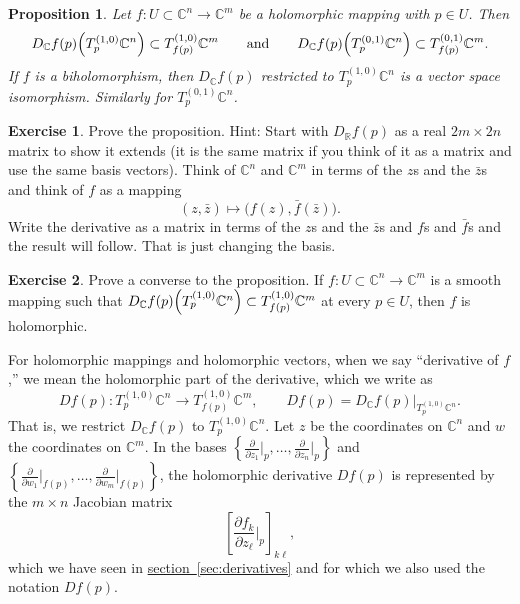 \documentclass[12pt,openany]{book}
\newcommand{\C}{{\mathbb{C}}}
\newcommand{\R}{{\mathbb{R}}}
\theoremstyle{plain}
\newtheorem{prop}[thm]{Proposition}
\theoremstyle{remark}
\theoremstyle{definition}
\newenvironment{exbox}{%
    \def\FrameCommand{\vrule width 1pt \relax\hspace{10pt}}%
    \MakeFramed{\advance\hsize-\width\FrameRestore}%
}{%
    \endMakeFramed
}
\theoremstyle{exercise}
\newtheorem{exercise}{Exercise}[section]
\theoremstyle{example}
\newcommand{\sectionref}[1]{\hyperref[#1]{section~\ref*{#1}}}
\begin{document}
\begin{prop} \label{prop:holvectmap}
Let $f \colon U \subset \C^n \to \C^m$ be a holomorphic mapping with
$p \in U$.
Then
\begin{equation*}
D_\C f(p)\Bigl(T_p^{(1,0)} \C^n\Bigr) \subset T_{f(p)}^{(1,0)} \C^m
\qquad \text{and} \qquad
D_\C f(p)\Bigl(T_p^{(0,1)} \C^n\Bigr) \subset T_{f(p)}^{(0,1)} \C^m .
\end{equation*}
If $f$ is a biholomorphism, then $D_\C f(p)$ restricted to $T_p^{(1,0)} \C^n$
is a vector space isomorphism.  Similarly for $T_p^{(0,1)} \C^n$.
\end{prop}

\begin{exbox}
\begin{exercise}
Prove the proposition.
Hint: Start with $D_\R f(p)$ as a real $2m \times 2n$ matrix to show it
extends (it is the same matrix if you think of it as a matrix
and use the same basis vectors).
Think of $\C^n$ and $\C^m$ in terms of the $z$s and the
$\bar{z}$s and think of $f$ as a mapping
\begin{equation*}
(z,\bar{z}) \mapsto \bigl( f(z) , \bar{f}(\bar{z}) \bigr) .
\end{equation*}
Write the derivative as a matrix in terms of the $z$s and the $\bar{z}$s
and $f$s and $\bar{f}$s and the result will follow.  That is just changing
the basis.
\end{exercise}

\begin{exercise}
Prove a converse to the proposition.  If $f \colon U \subset \C^n \to \C^m$
is a smooth mapping such that
$D_\C f(p)\Bigl(T_p^{(1,0)} \C^n\Bigr) \subset T_{f(p)}^{(1,0)} \C^m$
at every $p \in U$, then $f$ is holomorphic.
\end{exercise}
\end{exbox}

For holomorphic mappings and holomorphic vectors,
when we say ``derivative of $f$,'' we mean the holomorphic part of the
derivative, which we write as
%
\begin{equation*}
D f(p) \colon T_p^{(1,0)} \C^n \to T_{f(p)}^{(1,0)} \C^m ,
\qquad
D f(p) = D_{\C} f(p) \big|_{T_p^{(1,0)} \C^n} .
\end{equation*}
That is, we restrict $D_\C f(p)$ to $T_p^{(1,0)} \C^n$.
Let $z$ be the coordinates on $\C^n$ and
$w$ the coordinates on $\C^m$.
In the bases
$\left\{ \frac{\partial}{\partial z_1} \big|_p,\ldots,
\frac{\partial}{\partial z_n} \big|_p \right\}$
and
$\left\{ \frac{\partial}{\partial w_1} \big|_{f(p)},\ldots,
\frac{\partial}{\partial w_m} \big|_{f(p)} \right\}$,
the holomorphic derivative $Df(p)$
is represented by the $m \times n$ Jacobian matrix
\begin{equation*}
\left[
\frac{\partial f_k}{\partial z_\ell} \Big|_p
\right]_{k\ell} ,
\end{equation*}
which we have seen in \sectionref{sec:derivatives}
and for which we also used the notation $Df(p)$.
\end{document}

